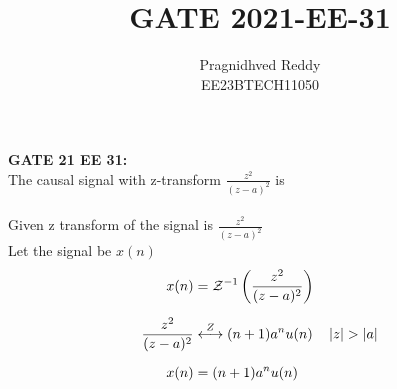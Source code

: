 \documentclass[journal,12pt,twocolumn]{IEEEtran}
\title{GATE 2021-EE-31}
\author{Pragnidhved Reddy\\EE23BTECH11050}
\date{}
\begin{document}
\maketitle
\newpage
\bigskip
\textbf{GATE 21 EE 31:}\\
The causal signal with z-transform $\frac{z^2}{(z-a)^{2}}$ is \\
\solution\\
Given z transform of the signal is $\frac{z^2}{(z-a)^{2}}$\\
Let the signal be $x(n)$
\begin{align}
x(n)&=\mathcal{Z}^{-1}\left(\frac{z^2}{(z-a)^{2}}\right)\\[6pt]
\frac{z^2}{(z-a)^2}&\overset{Z}\longleftrightarrow (n+1)a^nu(n)\quad \left\vert z\right\vert>\left\vert a\right\vert\\[6pt] 
x(n)&=(n+1)a^n u(n)
\end{align}
\end{document}
